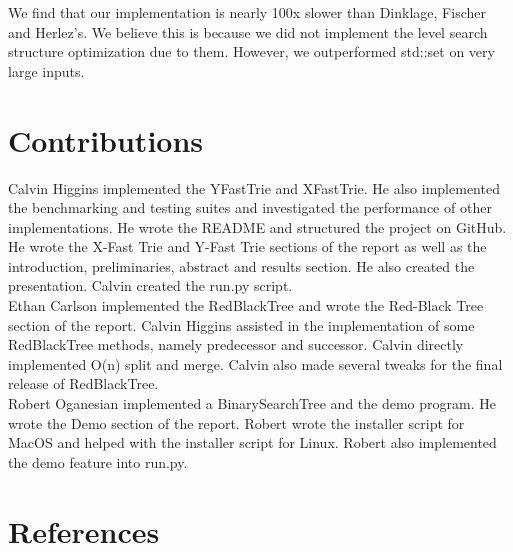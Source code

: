 \documentclass{article}
\begin{document}
\noindent
We find that our implementation is nearly 100x slower than Dinklage, Fischer and Herlez's. We believe this is because we did not implement the level search structure optimization due to them. However, we outperformed std::set on very large inputs.

\section{Contributions}

\noindent
Calvin Higgins implemented the YFastTrie and XFastTrie. He also implemented the benchmarking and testing suites and investigated the performance of other implementations. He wrote the README and structured the project on GitHub. He wrote the X-Fast Trie and Y-Fast Trie sections of the report as well as the introduction, preliminaries, abstract and results section. He also created the presentation. Calvin created the run.py script.
\\

\noindent
Ethan Carlson implemented the RedBlackTree and wrote the Red-Black Tree section of the report. Calvin Higgins assisted in the implementation of some RedBlackTree methods, namely predecessor and successor. Calvin directly implemented O(n) split and merge. Calvin also made several tweaks for the final release of RedBlackTree.
\\

\noindent
Robert Oganesian implemented a BinarySearchTree and the demo program. He wrote the Demo section of the report. Robert wrote the installer script for MacOS and helped with the installer script for Linux. Robert also implemented the demo feature into run.py.

\section{References}
\printbibliography
\end{document}
